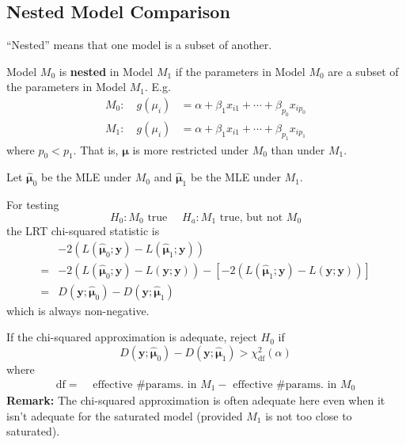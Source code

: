 \documentclass[11pt]{elegantbook}
\begin{document}
\subsection{Nested Model Comparison}
“Nested” means that one model is a subset of another.
\begin{definition}\normalfont
    Model $M_0$ is \textbf{nested} in Model $M_1$ if the parameters in Model $M_0$ are a subset of the parameters in Model $M_1$. E.g.
    \begin{equation}
        \begin{aligned}
            M_0:\quad g(\mu_i)&=\alpha+\beta_1 x_{i1}+\cdots +\beta_{p_0} x_{ip_0}\\
            M_1:\quad g(\mu_i)&=\alpha+\beta_1 x_{i1}+\cdots +\beta_{p_1} x_{ip_1}
        \end{aligned}
        \nonumber
    \end{equation}
    where $p_0<p_1$. That is, $\boldsymbol{\mu}$ is more restricted under $M_0$ than under $M_1$.
\end{definition}
Let $\hat{\boldsymbol{\mu}}_0$ be the MLE under $M_0$ and $\hat{\boldsymbol{\mu}}_1$ be the MLE under $M_1$.

For testing
$$
H_0: M_0 \text { true } \quad H_a: M_1 \text { true, but not } M_0
$$
the LRT chi-squared statistic is
$$
\begin{aligned}
&-2\left(L\left(\hat{\boldsymbol{\mu}}_0 ; \boldsymbol{y}\right)-\right. \left.L\left(\hat{\boldsymbol{\mu}}_1 ; \boldsymbol{y}\right)\right)\\
= & -2\left(L\left(\hat{\boldsymbol{\mu}}_0 ; \boldsymbol{y}\right)-L(\boldsymbol{y} ; \boldsymbol{y})\right)  -\left[-2\left(L\left(\hat{\boldsymbol{\mu}}_1 ; \boldsymbol{y}\right)-L(\boldsymbol{y} ; \boldsymbol{y})\right)\right] \\
= & D\left(\boldsymbol{y} ; \hat{\boldsymbol{\mu}}_0\right)-D\left(\boldsymbol{y} ; \hat{\boldsymbol{\mu}}_1\right)
\end{aligned}
$$
which is always non-negative.

If the chi-squared approximation is adequate, reject $H_0$ if
$$
D\left(\boldsymbol{y} ; \hat{\boldsymbol{\mu}}_0\right)-D\left(\boldsymbol{y} ; \hat{\boldsymbol{\mu}}_1\right)>\chi_{\mathrm{df}}^2(\alpha)
$$
where
$$
\begin{aligned}
\mathrm{df}= & \text { effective \# params. in } M_1 -\text { effective \# params. in } M_0
\end{aligned}
$$
\textbf{Remark:} The chi-squared approximation is often adequate here even when it isn't adequate for the saturated model (provided $M_1$ is not too close to saturated).
\end{document}
